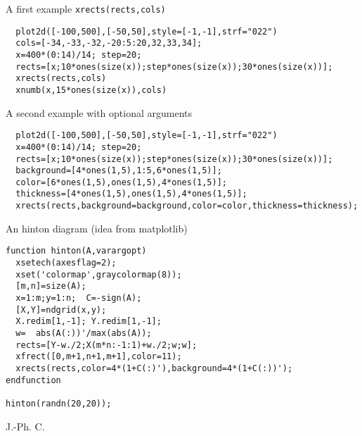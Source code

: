 \begin{examples}

\noindent A first example \verb!xrects(rects,cols)!

\begin{Verbatim}
  plot2d([-100,500],[-50,50],style=[-1,-1],strf="022")
  cols=[-34,-33,-32,-20:5:20,32,33,34];
  x=400*(0:14)/14; step=20;
  rects=[x;10*ones(size(x));step*ones(size(x));30*ones(size(x))];
  xrects(rects,cols)
  xnumb(x,15*ones(size(x)),cols)
\end{Verbatim}

\noindent A second example with optional arguments

\begin{Verbatim}
  plot2d([-100,500],[-50,50],style=[-1,-1],strf="022")
  x=400*(0:14)/14; step=20;
  rects=[x;10*ones(size(x));step*ones(size(x));30*ones(size(x))];
  background=[4*ones(1,5),1:5,6*ones(1,5)];
  color=[6*ones(1,5),ones(1,5),4*ones(1,5)];
  thickness=[4*ones(1,5),ones(1,5),4*ones(1,5)];
  xrects(rects,background=background,color=color,thickness=thickness);
\end{Verbatim}

\noindent An hinton diagram (idea from matplotlib)

\begin{Verbatim}
function hinton(A,varargopt)
  xsetech(axesflag=2);
  xset('colormap',graycolormap(8));
  [m,n]=size(A);
  x=1:m;y=1:n;  C=-sign(A);
  [X,Y]=ndgrid(x,y);
  X.redim[1,-1]; Y.redim[1,-1];
  w=  abs(A(:))'/max(abs(A));
  rects=[Y-w./2;X(m*n:-1:1)+w./2;w;w];
  xfrect([0,m+1,n+1,m+1],color=11);
  xrects(rects,color=4*(1+C(:)'),background=4*(1+C(:))');
endfunction

hinton(randn(20,20));
\end{Verbatim}

\end{examples}
\begin{manseealso}
   
\end{manseealso}
\begin{authors}
  J.-Ph. C.
\end{authors}
